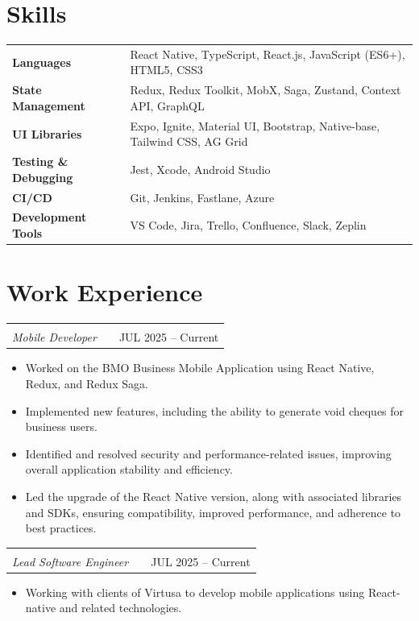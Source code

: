 \documentclass[a4paper,12pt]{article}
\makeatletter
\newenvironment{joblong}[2]
    {
    \begin{tabularx}{\linewidth}{@{}l X r@{}}
    \textbf{#1} & \hfill & #2 \\[3.75pt]
    \end{tabularx}
    \begin{minipage}[t]{\linewidth}
    \begin{itemize}[nosep,after=\strut,leftmargin=1em,itemsep=3pt,label=--]
    }
    {
    \end{itemize}
    \end{minipage}
    }
\newcommand{\jobheading}[2]{%
    \begin{tabular}[t]{@{}l@{}}
    #1\\[-1pt]
    \normalfont\textit{#2}
    \end{tabular}%
}
\makeatother
\begin{document}
\section{Skills}
\begin{tabularx}{\linewidth}{@{}l X@{}}
\textbf{Languages} & React Native, TypeScript, React.js, JavaScript (ES6+), HTML5, CSS3 \\[3pt]
\textbf{State Management} & Redux, Redux Toolkit, MobX, Saga, Zustand, Context API, GraphQL \\[3pt]
\textbf{UI Libraries} & Expo, Ignite, Material UI, Bootstrap, Native-base, Tailwind CSS, AG Grid \\[3pt]
\textbf{Testing \& Debugging} & Jest, Xcode, Android Studio \\[3pt]
\textbf{CI/CD} & Git, Jenkins, Fastlane, Azure \\[3pt]
\textbf{Development Tools} & VS Code, Jira, Trello, Confluence, Slack, Zeplin \\
\end{tabularx}


\section{Work Experience}

\begin{joblong}
{\jobheading{BMO, Toronto, CA}{Mobile Developer}}
{JUL 2025 -- Current}
\item Worked on the BMO Business Mobile Application using React Native, Redux, and Redux Saga.
\item Implemented new features, including the ability to generate void cheques for business users.
\item Identified and resolved security and performance-related issues, improving overall application stability and efficiency.
\item Led the upgrade of the React Native version, along with associated libraries and SDKs, ensuring compatibility, improved performance, and adherence to best practices.
\end{joblong}

\begin{joblong}
{\jobheading{Virtusa, Toronto, CA}{Lead Software Engineer}}
{JUL 2025 -- Current}
\item Working with clients of Virtusa to develop mobile applications using React-native and related technologies.
\end{joblong}
\end{document}
